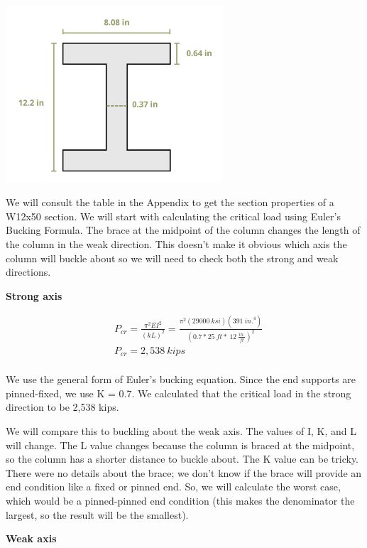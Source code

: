 \documentclass[
  letterpaper,
  DIV=11,
  numbers=noendperiod]{scrreprt}
\theoremstyle{definition}
\theoremstyle{remark}
\begin{document}
\begin{tcolorbox}
\begin{tcolorbox}
\begin{center}
\includegraphics[width=3.17708in,height=\textheight]{images/CH15s PNGs/example 15.3 copy.png}
\end{center}

We will consult the table in the Appendix to get the section properties
of a W12x50 section. We will start with calculating the critical load
using Euler's Bucking Formula. The brace at the midpoint of the column
changes the length of the column in the weak direction. This doesn't
make it obvious which axis the column will buckle about so we will need
to check both the strong and weak directions.

\textbf{Strong axis}

\[
\begin{aligned}
& P_{cr}=\frac{\pi^2 E I^2}{(k L)^2}=\frac{\pi^2(29000{~ksi})(391{~in.}^4)}{\left(0.7*25{~ft}*~12~\frac{in.}{ft}\right)^2} \\
& P_{c r}=2,538{~kips} \\
&
\end{aligned}
\]

We use the general form of Euler's bucking equation. Since the end
supports are pinned-fixed, we use K = 0.7. We calculated that the
critical load in the strong direction to be 2,538 kips.

We will compare this to buckling about the weak axis. The values of I,
K, and L will change. The L value changes because the column is braced
at the midpoint, so the column has a shorter distance to buckle about.
The K value can be tricky. There were no details about the brace; we
don't know if the brace will provide an end condition like a fixed or
pinned end. So, we will calculate the worst case, which would be a
pinned-pinned end condition (this makes the denominator the largest, so
the result will be the smallest).

\textbf{Weak axis}


\end{tcolorbox}
\end{tcolorbox}
\end{document}
